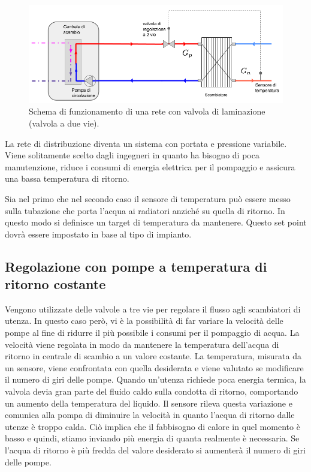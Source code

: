 \documentclass[laurea,oneside,11pt]{USiena_tesiLM}
\begin{document}
\begin{figure}[!ht]
\centering
\includegraphics[width=\textwidth]{figure/2vie}
\caption{Schema di funzionamento di una rete con valvola di laminazione (valvola a due vie).}
\label{fig:2vie}

\end{figure}

La rete di distribuzione diventa un sistema con portata e pressione variabile. Viene solitamente scelto dagli ingegneri in quanto ha bisogno di poca manutenzione, riduce i consumi di energia elettrica per il pompaggio e assicura una bassa temperatura di ritorno.

Sia nel primo che nel secondo caso il sensore di temperatura può essere messo sulla tubazione che porta l'acqua ai radiatori anziché su quella di ritorno. In questo modo si definisce un target di temperatura da mantenere. Questo set point dovrà essere impostato in base al tipo di impianto.

\subsection{Regolazione con pompe a temperatura di ritorno costante}
Vengono utilizzate delle valvole a tre vie per regolare il flusso agli scambiatori di utenza. In questo caso però, vi è la possibilità di far variare la velocità delle pompe al fine di ridurre il più possibile i consumi per il pompaggio di acqua.
La velocità viene regolata in modo da mantenere la temperatura dell'acqua di ritorno in centrale di scambio a un valore costante. La temperatura, misurata da un sensore, viene confrontata con quella desiderata e viene valutato se modificare il numero di giri delle pompe. 
Quando un'utenza richiede poca energia termica, la valvola devia gran parte del fluido caldo sulla condotta di ritorno, comportando un aumento della temperatura del liquido. Il sensore rileva questa variazione e comunica alla pompa di diminuire la velocità in quanto l'acqua di ritorno dalle utenze è troppo calda. Ciò implica che il fabbisogno di calore in quel momento è basso e quindi, stiamo inviando più energia di quanta realmente è necessaria. Se l'acqua di ritorno è più fredda del valore desiderato si aumenterà il numero di giri delle pompe. 
\end{document}
